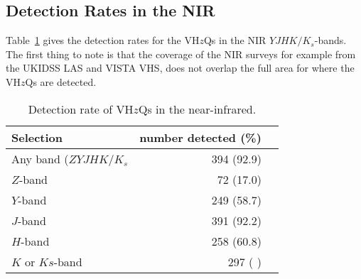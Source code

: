 \documentclass[usenatbib]{mnras}
\begin{document}

    \subsection{Detection Rates in the NIR}
    Table~\ref{tab:nir_detection} gives the detection rates for the 
    VH$z$Qs in the NIR $YJHK/K_{s}$-bands. 
    The first thing to note is that the coverage of the NIR surveys 
    for example from the UKIDSS LAS and VISTA VHS, does
    not overlap the full area for where the VH$z$Qs are detected. 

    \begin{table}
          \centering

      \begin{tabular}{l r l}
        \hline  \hline
        Selection   & number detected (\%) \\
        \hline  
        Any band ($ZYJHK/K_{s}$   &  394  (92.9) \\
        $Z$-band    &  72  (17.0) \\
        $Y$-band    &  249  (58.7) \\
        $J$-band    &  391  (92.2) \\
        $H$-band    &  258  (60.8) \\
        $K$ or $Ks$-band    &  297  ( ) \\
        \hline  \hline
      \end{tabular}
      \caption{Detection rate of VH$z$Qs in the near-infrared.}
      \label{tab:nir_detection}
    \end{table}
\end{document}
